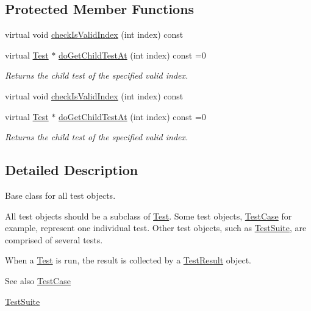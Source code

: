 \subsection*{Protected Member Functions}
\begin{DoxyCompactItemize}
\item 
virtual void \hyperlink{class_test_a74f13006fbb12c41bf4afaf1f232b284}{check\+Is\+Valid\+Index} (int index) const 
\item 
virtual \hyperlink{class_test}{Test} $\ast$ \hyperlink{class_test_a5c2ca854987799dca293ba78689bf64d}{do\+Get\+Child\+Test\+At} (int index) const =0
\begin{DoxyCompactList}\small\item\em Returns the child test of the specified valid index. \end{DoxyCompactList}\item 
virtual void \hyperlink{class_test_a417a24c245c6273c7886680ab3e30849}{check\+Is\+Valid\+Index} (int index) const 
\item 
virtual \hyperlink{class_test}{Test} $\ast$ \hyperlink{class_test_a5c2ca854987799dca293ba78689bf64d}{do\+Get\+Child\+Test\+At} (int index) const =0
\begin{DoxyCompactList}\small\item\em Returns the child test of the specified valid index. \end{DoxyCompactList}\end{DoxyCompactItemize}


\subsection{Detailed Description}
Base class for all test objects.

All test objects should be a subclass of \hyperlink{class_test}{Test}. Some test objects, \hyperlink{class_test_case}{Test\+Case} for example, represent one individual test. Other test objects, such as \hyperlink{class_test_suite}{Test\+Suite}, are comprised of several tests. 

When a \hyperlink{class_test}{Test} is run, the result is collected by a \hyperlink{class_test_result}{Test\+Result} object.

\begin{DoxySeeAlso}{See also}
\hyperlink{class_test_case}{Test\+Case} 

\hyperlink{class_test_suite}{Test\+Suite} 
\end{DoxySeeAlso}


